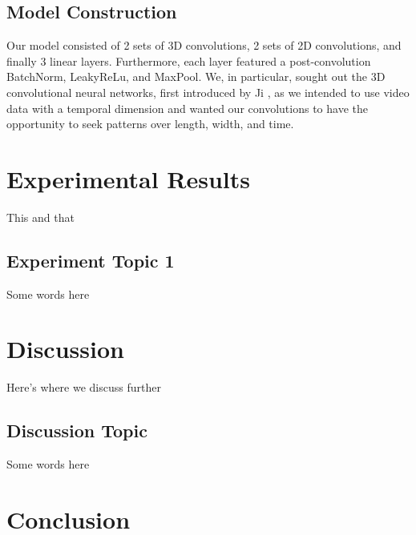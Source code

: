 \documentclass[10pt,twocolumn,letterpaper]{article}
\begin{document}
\subsection{Model Construction}

Our model consisted of 2 sets of 3D convolutions, 2 sets of 2D convolutions, and finally 3 linear layers. Furthermore, each layer featured a post-convolution BatchNorm, LeakyReLu, and MaxPool. We, in particular, sought out the 3D convolutional neural networks, first introduced by Ji  \cite{Ji3DConv}, as we intended to use video data with a temporal dimension and wanted our convolutions to have the opportunity to seek patterns over length, width, and time.  



\section{Experimental Results}
\label{sec:results}

This and that

\subsection{Experiment Topic 1}

Some words here

\section{Discussion}
\label{sec:discussion}

Here's where we discuss further

\subsection{Discussion Topic}

Some words here

\section{Conclusion}
\label{sec:conclusion}
\end{document}
